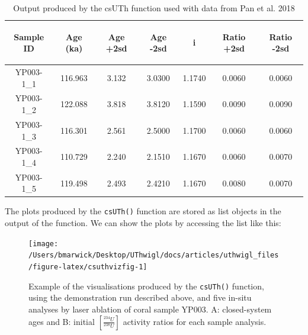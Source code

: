 \documentclass[]{elsarticle} %
\newenvironment{Shaded}{\begin{snugshade}}{\end{snugshade}}
\newcommand{\NormalTok}[1]{#1}
\newcommand{\SpecialCharTok}[1]{\textcolor[rgb]{0.00,0.00,0.00}{#1}}
\begin{document}
\begin{table}[ht]
\centering
\begin{tabular}{ccccccc}
  \hline
\begin{sideways} Sample ID \end{sideways} & \begin{sideways} Age (ka) \end{sideways} & \begin{sideways} Age +2sd \end{sideways} & \begin{sideways} Age -2sd \end{sideways} & \begin{sideways} [234U/238U]i \end{sideways} & \begin{sideways} Ratio +2sd \end{sideways} & \begin{sideways} Ratio -2sd \end{sideways} \\ 
  \hline
YP003-1\_1 & 116.963 & 3.132 & 3.0300 & 1.1740 & 0.0060 & 0.0060 \\ 
  YP003-1\_2 & 122.088 & 3.818 & 3.8120 & 1.1590 & 0.0090 & 0.0090 \\ 
  YP003-1\_3 & 116.301 & 2.561 & 2.5000 & 1.1700 & 0.0060 & 0.0060 \\ 
  YP003-1\_4 & 110.729 & 2.240 & 2.1510 & 1.1670 & 0.0060 & 0.0070 \\ 
  YP003-1\_5 & 119.498 & 2.493 & 2.4210 & 1.1670 & 0.0080 & 0.0070 \\ 
   \hline
\end{tabular}
\caption{\label{tab:panoutput}Output produced by the csUTh function used with data from Pan et al. 2018} 
\end{table}

The plots produced by the \texttt{csUTh()} function are stored as list objects in the output of the function. We can show the plots by accessing the list like this:



\begin{Shaded}
\end{Shaded}

\begin{figure}
\texttt{[image: /Users/bmarwick/Desktop/UThwigl/docs/articles/uthwigl\_files/figure-latex/csuthvizfig-1]} \caption{Example of the visualisations produced by the \texttt{csUTh()} function, using the demonstration run described above, and five in-situ analyses by laser ablation of coral sample YP003. A: closed-system ages and B: initial \([\frac{^{234}U}{^{238}U}]\) activity ratios for each sample analysis.}\label{fig:csuthvizfig}
\end{figure}
\end{document}

